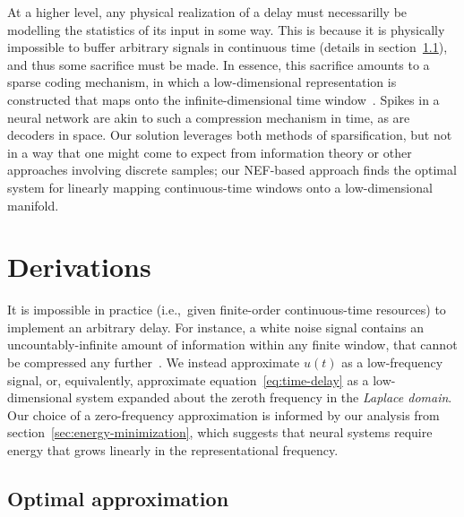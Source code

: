 At a higher level, any physical realization of a delay must necessarilly be modelling the statistics of its input in some way.
This is because it is physically impossible to buffer arbitrary signals in continuous time (details in section~\ref{sec:nef-delay}), and thus some sacrifice must be made.
In essence, this sacrifice amounts to a sparse coding mechanism, in which a low-dimensional representation is constructed that maps onto the infinite-dimensional time window~\citep{blumensath2009sampling}.
Spikes in a neural network are akin to such a compression mechanism in time, as are decoders in space.
Our solution leverages both methods of sparsification, but not in a way that one might come to expect from information theory or other approaches involving discrete samples; our NEF-based approach finds the optimal system for linearly mapping continuous-time windows onto a low-dimensional manifold.

\section{Derivations}

It is impossible in practice (i.e.,~given finite-order continuous-time resources) to implement an arbitrary delay.
For instance, a white noise signal contains an uncountably-infinite amount of information within any finite window, that cannot be compressed any further~\citep{cover2012elements}.
We instead approximate $u(t)$ as a low-frequency signal, or, equivalently, approximate equation~\ref{eq:time-delay} as a low-dimensional system expanded about the zeroth frequency in the \emph{Laplace domain}.
Our choice of a zero-frequency approximation is informed by our analysis from section~\ref{sec:energy-minimization}, which suggests that neural systems require energy that grows linearly in the representational frequency.

\subsection{Optimal approximation}
\label{sec:nef-delay}

